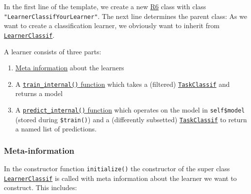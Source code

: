\documentclass[]{article}
\providecommand{\tightlist}{%
  \setlength{\itemsep}{0pt}\setlength{\parskip}{0pt}}
\begin{document}
In the first line of the template, we create a new \href{https://cran.r-project.org/package=R6}{R6} class with class \texttt{"LearnerClassifYourLearner"}.
The next line determines the parent class:
As we want to create a classification learner, we obviously want to inherit from \href{https://mlr3.mlr-org.com/reference/LearnerClassif.html}{\texttt{LearnerClassif}}.

A learner consists of three parts:

\begin{enumerate}
\def\labelenumi{\arabic{enumi}.}
\tightlist
\item
  \protect\hyperlink{learner-meta-information}{Meta information} about the learners
\item
  A \protect\hyperlink{learner-train}{\texttt{train\_internal()} function} which takes a (filtered) \href{https://mlr3.mlr-org.com/reference/TaskClassif.html}{\texttt{TaskClassif}} and returns a model
\item
  A \protect\hyperlink{learner-predict}{\texttt{predict\_internal()} function} which operates on the model in \texttt{self\$model} (stored during \texttt{\$train()}) and a (differently subsetted) \href{https://mlr3.mlr-org.com/reference/TaskClassif.html}{\texttt{TaskClassif}} to return a named list of predictions.
\end{enumerate}

\hypertarget{learner-meta-information}{%
\subsubsection{Meta-information}\label{learner-meta-information}}

In the constructor function \texttt{initialize()} the constructor of the super class \href{https://mlr3.mlr-org.com/reference/LearnerClassif.html}{\texttt{LearnerClassif}} is called with meta information about the learner we want to construct.
This includes:
\end{document}
